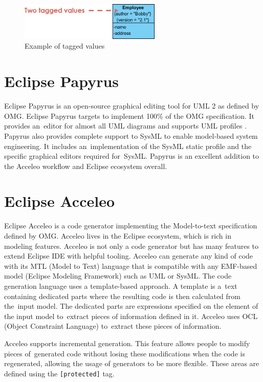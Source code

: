 \begin{figure}[H]
    \centering
    \includegraphics[width=0.6\textwidth]{obrazky-figures/02-class-with-tagged-value.png}
    \caption{Example of tagged values}
    \label{fig:tagged}
\end{figure}


\section{Eclipse Papyrus}

Eclipse Papyrus is an open-source graphical editing tool for UML 2 as defined by OMG. Eclipse Papyrus targets to implement 100\% of the OMG specification. It provides an~editor for almost all UML diagrams and supports UML profiles \cite{papyrus}. Papyrus also provides complete support to SysML to enable model-based system engineering. It includes an~implementation of the SysML static profile and the specific graphical editors required for~SysML. Papyrus is an excellent addition to the Acceleo workflow and Eclipse ecosystem overall.

\section{Eclipse Acceleo}

Eclipse Acceleo is a code generator implementing the Model-to-text specification \cite{mofm2t} defined by OMG. Acceleo lives in the Eclipse ecosystem, which is rich in modeling features. Acceleo is not only a code generator but has many features to extend Eclipse IDE with helpful tooling. Acceleo can generate any kind of code with its MTL (Model to Text) language that is compatible with any EMF-based model (Eclipse Modeling Framework) such as UML or SysML. The code generation language uses a template-based approach. A template is a~text containing dedicated parts where the resulting code is then calculated from the~input model. The dedicated parts are expressions specified on the element of the input model to~extract pieces of information defined in it. Acceleo uses OCL (Object Constraint Language) to~extract these pieces of information.

Acceleo supports incremental generation. This feature allows people to modify pieces of~generated code without losing these modifications when the code is regenerated, allowing the usage of generators to be more flexible. These areas are defined using the \texttt{[protected]} tag.



